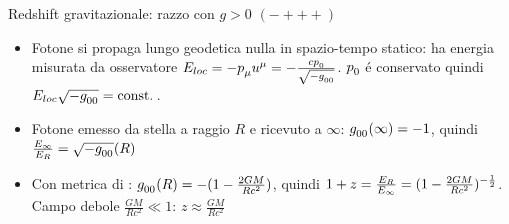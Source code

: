 \begin{frame}[t]{Redshift gravitazionale: razzo con $g>0$ $(-+++)$}
\begin{itemize}
    \item Fotone si propaga lungo geodetica nulla in spazio-tempo statico: ha energia misurata da osservatore $E_{loc}=-\tensor{p}{_{\mu}}\tensor{u}{^{\mu}}=-\frac{c \tensor{p}{_0}}{\sqrt{-\tensor{g}{_{00}}}}$. $\tensor{p}{_0}$ \'e conservato quindi $E_{loc}\sqrt{-\tensor{g}{_{00}}}=\const{}$.
    \item Fotone emesso da stella a raggio $R$ e ricevuto a $\infty$: $\tensor{g}{_{00}}(\infty)=-1$, quindi $\frac{E_{\infty}}{E_R}=\sqrt{-\tensor{g}{_{00}}}(R)$
    \item Con metrica di \sch: $\tensor{g}{_{00}}(R)=-(1-\frac{2GM}{Rc^2})$, quindi $1+z=\frac{E_R}{E_{\infty}}=(1-\frac{2GM}{Rc^2})^{-\frac{1}{2}}$. Campo debole $\frac{GM}{Rc^2}\ll1$: $z\approx \frac{GM}{Rc^2}$
\end{itemize}
\end{frame}

